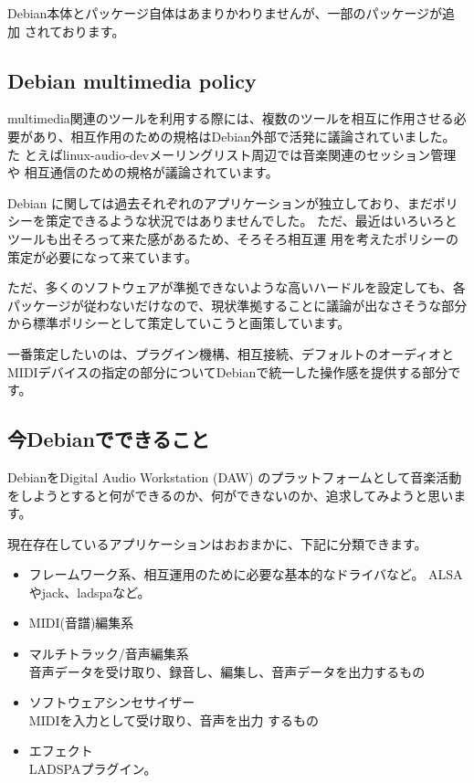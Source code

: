 \documentclass[mingoth,a4paper]{jsarticle}
\begin{document}
Debian本体とパッケージ自体はあまりかわりませんが、一部のパッケージが追加
されております。

\subsection{Debian multimedia policy}

multimedia関連のツールを利用する際には、複数のツールを相互に作用させる必
要があり、相互作用のための規格はDebian外部で活発に議論されていました。た
とえばlinux-audio-devメーリングリスト周辺では音楽関連のセッション管理や
相互通信のための規格が議論されています。

Debian に関しては過去それぞれのアプリケーションが独立しており、まだポリ
シーを策定できるような状況ではありませんでした。
ただ、最近はいろいろとツールも出そろって来た感があるため、そろそろ相互運
用を考えたポリシーの策定が必要になって来ています。

ただ、多くのソフトウェアが準拠できないような高いハードルを設定しても、各
パッケージが従わないだけなので、現状準拠することに議論が出なさそうな部分
から標準ポリシーとして策定していこうと画策しています。

一番策定したいのは、プラグイン機構、相互接続、デフォルトのオーディオと
MIDIデバイスの指定の部分についてDebianで統一した操作感を提供する部分です。

\subsection{今Debianでできること}

DebianをDigital Audio Workstation (DAW) のプラットフォームとして音楽活動
をしようとすると何ができるのか、何ができないのか、追求してみようと思いま
す。

現在存在しているアプリケーションはおおまかに、下記に分類できます。

\begin{itemize}
 \item フレームワーク系、相互運用のために必要な基本的なドライバなど。
       ALSAやjack、ladspaなど。
 \item MIDI(音譜)編集系
 \item マルチトラック/音声編集系\\
       音声データを受け取り、録音し、編集し、音声データを出力するもの
 \item ソフトウェアシンセサイザー\\MIDIを入力として受け取り、音声を出力
       するもの
 \item エフェクト\\LADSPAプラグイン。
\end{itemize}
\end{document}
